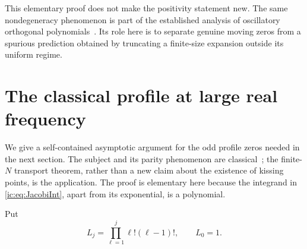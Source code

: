 \documentclass[11pt,a4paper]{article}
\numberwithin{equation}{section}
\theoremstyle{definition}
\theoremstyle{remark}
\begin{document}
This elementary proof does not make the positivity statement new. The
same nondegeneracy phenomenon is part of the established analysis of
oscillatory orthogonal polynomials~\cite{CelsusDeanoHuybrechsIserles2022}. Its role here is to
separate genuine moving zeros from a spurious prediction obtained by
truncating a finite-size expansion outside its uniform regime.

\section{The classical profile at large real frequency}\label{ic:sec:frequency}
We give a self-contained asymptotic argument for the odd profile zeros
needed in the next section. The subject and its parity phenomenon are
classical~\cite{CelsusDeanoHuybrechsIserles2022}; the finite-$N$ transport theorem, rather than a
new claim about the existence of kissing points, is the application.
The proof is elementary here because the integrand in
\eqref{ic:eq:JacobiInt}, apart from its exponential, is a polynomial.

Put
\begin{equation}\label{ic:eq:Lagconst}
 L_j=\prod_{\ell=1}^j\ell!(\ell-1)!,\qquad L_0=1.
\end{equation}
\end{document}
